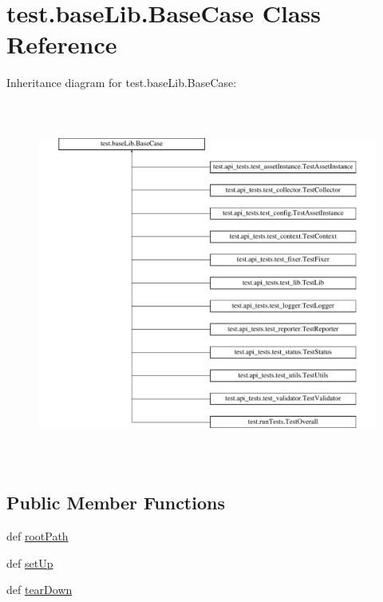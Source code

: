\hypertarget{classtest_1_1baseLib_1_1BaseCase}{\section{test.\-base\-Lib.\-Base\-Case \-Class \-Reference}
\label{d5/daf/classtest_1_1baseLib_1_1BaseCase}
}
\-Inheritance diagram for test.\-base\-Lib.\-Base\-Case\-:\begin{figure}[H]
\begin{center}
\leavevmode
\includegraphics[height=12.000000cm]{d5/daf/classtest_1_1baseLib_1_1BaseCase}
\end{center}
\end{figure}
\subsection*{\-Public \-Member \-Functions}
\begin{DoxyCompactItemize}
\item 
def \hyperlink{classtest_1_1baseLib_1_1BaseCase_a8ccb91ffbeb44d5cf9400595d04514f4}{root\-Path}
\item 
def \hyperlink{classtest_1_1baseLib_1_1BaseCase_a35bbc08d726a38916fe41a2b639f9ace}{set\-Up}
\item 
def \hyperlink{classtest_1_1baseLib_1_1BaseCase_aa533e8350e4bb67500eacac22cd52603}{tear\-Down}
\end{DoxyCompactItemize}



